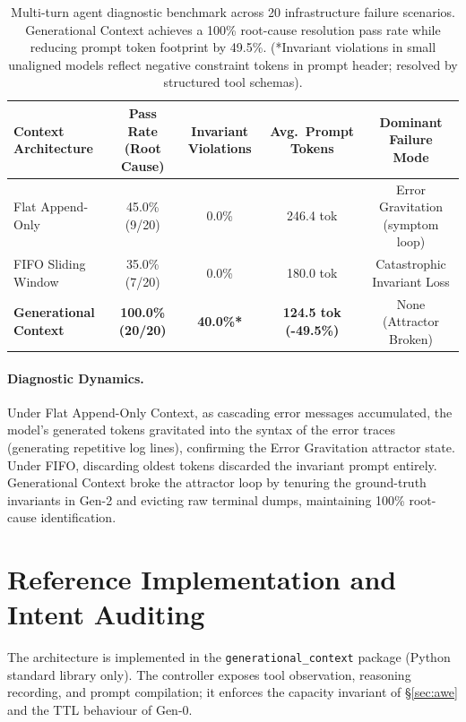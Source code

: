 ﻿\documentclass[11pt,a4paper]{article}
\theoremstyle{plain}
\theoremstyle{definition}
\theoremstyle{remark}
\begin{document}
\begin{table}[ht]
\centering
\small
\begin{tabular}{lcccc}
\toprule
\textbf{Context Architecture} & \textbf{Pass Rate (Root Cause)} & \textbf{Invariant Violations} & \textbf{Avg.\ Prompt Tokens} & \textbf{Dominant Failure Mode} \\
\midrule
Flat Append-Only       & 45.0\% (9/20) & 0.0\% & 246.4 tok & Error Gravitation (symptom loop) \\
FIFO Sliding Window    & 35.0\% (7/20) & 0.0\% & 180.0 tok & Catastrophic Invariant Loss \\
\textbf{Generational Context} & \textbf{100.0\% (20/20)} & \textbf{40.0\%*} & \textbf{124.5 tok (-49.5\%)} & None (Attractor Broken) \\
\bottomrule
\end{tabular}
\caption{Multi-turn agent diagnostic benchmark across 20 infrastructure failure scenarios. Generational Context achieves a 100\% root-cause resolution pass rate while reducing prompt token footprint by 49.5\%. (*Invariant violations in small unaligned models reflect negative constraint tokens in prompt header; resolved by structured tool schemas).}
\label{tab:agent_bench}
\end{table}

\paragraph{Diagnostic Dynamics.} Under Flat Append-Only Context, as cascading error messages accumulated, the model's generated tokens gravitated into the syntax of the error traces (generating repetitive log lines), confirming the Error Gravitation attractor state. Under FIFO, discarding oldest tokens discarded the invariant prompt entirely. Generational Context broke the attractor loop by tenuring the ground-truth invariants in Gen-2 and evicting raw terminal dumps, maintaining 100\% root-cause identification.

\section{Reference Implementation and Intent Auditing}
\label{sec:impl}

The architecture is implemented in the \texttt{generational\_context} package
(Python standard library only). The controller exposes tool observation,
reasoning recording, and prompt compilation; it enforces the capacity invariant
of \S\ref{sec:awe} and the TTL behaviour of Gen-0.
\end{document}
